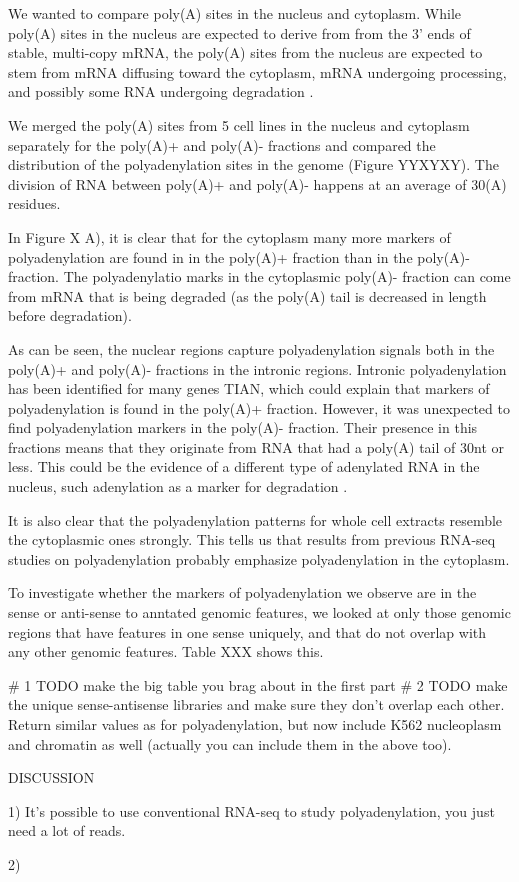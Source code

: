\documentclass[a4paper]{article}
\begin{document}
We wanted to compare poly(A) sites in the nucleus and cytoplasm. While poly(A)
sites in the nucleus are expected to derive from from the 3' ends of stable,
multi-copy mRNA, the poly(A) sites from the nucleus are expected to stem from
mRNA diffusing toward the cytoplasm, mRNA undergoing processing, and possibly
some RNA undergoing degradation
\cite{shcherbik_polyadenylation_2010,slomovic_addition_2010}.

We merged the poly(A) sites from 5 cell lines in the nucleus and cytoplasm
separately for the poly(A)+ and poly(A)- fractions and
compared the distribution of the polyadenylation sites in the genome (Figure
YYXYXY). The division of RNA between poly(A)+ and poly(A)- happens at an
average of 30(A) residues.

In Figure X A), it is clear that for the cytoplasm many more markers of
polyadenylation are found in in the poly(A)+ fraction than in the poly(A)-
fraction. The polyadenylatio marks in the cytoplasmic poly(A)- fraction can
come from mRNA that is being degraded (as the poly(A) tail is decreased in
length before degradation).

As can be seen, the nuclear regions capture polyadenylation signals both in the
poly(A)+ and poly(A)- fractions in the intronic regions. Intronic
polyadenylation has been identified for many genes \cite{}TIAN, which could
explain that markers of polyadenylation is found in the poly(A)+ fraction.
However, it was unexpected to find polyadenylation markers in the poly(A)-
fraction. Their presence in this fractions means that they originate from RNA
that had a poly(A) tail of 30nt or less. This could be the evidence of a
different type of adenylated RNA in the nucleus, such adenylation as a marker
for degradation \cite{}.

It is also clear that the polyadenylation patterns for whole cell extracts
resemble the cytoplasmic ones strongly. This tells us that results from
previous RNA-seq studies on polyadenylation probably emphasize polyadenylation
in the cytoplasm.

To investigate whether the markers of polyadenylation we observe are in the
sense or anti-sense to anntated genomic features, we looked at only those
genomic regions that have features in one sense uniquely, and that do not
overlap with any other genomic features. Table XXX shows this.

# 1 TODO make the big table you brag about in the first part
# 2 TODO make the unique sense-antisense libraries and make sure they don't
overlap each other. Return similar values as for polyadenylation, but now
include K562 nucleoplasm and chromatin as well (actually you can include them
in the above too).

DISCUSSION

1) It's possible to use conventional RNA-seq to study polyadenylation, you just
need a lot of reads.

2) 


%

\end{document}
